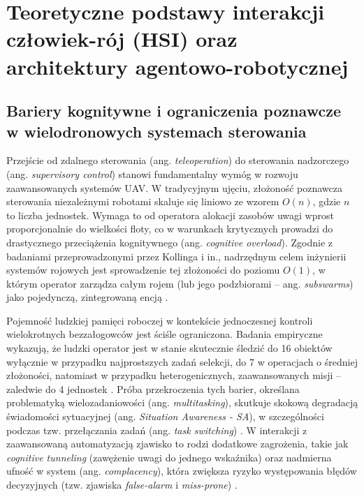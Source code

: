 \newpage
\section{Teoretyczne podstawy interakcji człowiek-rój (HSI) oraz architektury agentowo-robotycznej}

\subsection{Bariery kognitywne i ograniczenia poznawcze w wielodronowych systemach sterowania}
Przejście od zdalnego sterowania (ang. \textit{teleoperation}) do sterowania nadzorczego (ang. \textit{supervisory control}) stanowi fundamentalny wymóg w rozwoju zaawansowanych systemów UAV. W tradycyjnym ujęciu, złożoność poznawcza sterowania niezależnymi robotami skaluje się liniowo ze wzorem $O(n)$, gdzie $n$ to liczba jednostek. Wymaga to od operatora alokacji zasobów uwagi wprost proporcjonalnie do wielkości floty, co w warunkach krytycznych prowadzi do drastycznego przeciążenia kognitywnego (ang. \textit{cognitive overload}). Zgodnie z badaniami przeprowadzonymi przez Kollinga i in., nadrzędnym celem inżynierii systemów rojowych jest sprowadzenie tej złożoności do poziomu $O(1)$, w którym operator zarządza całym rojem (lub jego podzbiorami -- ang. \textit{subswarms}) jako pojedynczą, zintegrowaną encją \cite{kolling2016}.

Pojemność ludzkiej pamięci roboczej w kontekście jednoczesnej kontroli wielokrotnych bezzałogowców jest ściśle ograniczona. Badania empiryczne wykazują, że ludzki operator jest w stanie skutecznie śledzić do 16 obiektów wyłącznie w przypadku najprostszych zadań selekcji, do 7 w operacjach o średniej złożoności, natomiast w przypadku heterogenicznych, zaawansowanych misji -- zaledwie do 4 jednostek \cite{dia2010}. Próba przekroczenia tych barier, określana problematyką wielozadaniowości (ang. \textit{multitasking}), skutkuje skokową degradacją świadomości sytuacyjnej (ang. \textit{Situation Awareness - SA}), w szczególności podczas tzw. przełączania zadań (ang. \textit{task switching}) \cite{chen2010}. W interakcji z zaawansowaną automatyzacją zjawisko to rodzi dodatkowe zagrożenia, takie jak \textit{cognitive tunneling} (zawężenie uwagi do jednego wskaźnika) oraz nadmierna ufność w system (ang. \textit{complacency}), która zwiększa ryzyko występowania błędów decyzyjnych (tzw. zjawiska \textit{false-alarm} i \textit{miss-prone}) \cite{chen2010}.

